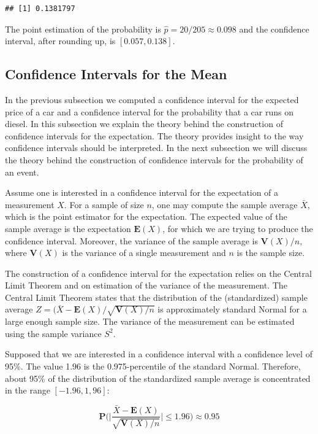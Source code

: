 \documentclass[
]{krantz}
\newcommand{\Expec}{\mathbf{E}}
\newcommand{\Prob}{\mathbf{P}}
\newcommand{\Var}{\mathbf{V}}
\theoremstyle{definition}
\theoremstyle{definition}
\theoremstyle{definition}
\theoremstyle{remark}
\begin{document}
\begin{verbatim}
## [1] 0.1381797
\end{verbatim}

The point estimation of the probability is
\(\hat p = 20/205 \approx 0.098\) and the confidence interval, after
rounding up, is \([0.057, 0.138]\).

\hypertarget{subsec:CImean}{%
\subsection{Confidence Intervals for the Mean}\label{subsec:CImean}}

In the previous subsection we computed a confidence interval for the
expected price of a car and a confidence interval for the probability
that a car runs on diesel. In this subsection we explain the theory
behind the construction of confidence intervals for the expectation. The
theory provides insight to the way confidence intervals should be
interpreted. In the next subsection we will discuss the theory behind
the construction of confidence intervals for the probability of an
event.

Assume one is interested in a confidence interval for the expectation of
a measurement \(X\). For a sample of size \(n\), one may compute the sample
average \(\bar X\), which is the point estimator for the expectation. The
expected value of the sample average is the expectation \(\Expec(X)\), for
which we are trying to produce the confidence interval. Moreover, the
variance of the sample average is \(\Var(X)/n\), where \(\Var(X)\) is the
variance of a single measurement and \(n\) is the sample size.

The construction of a confidence interval for the expectation relies on
the Central Limit Theorem and on estimation of the variance of the
measurement. The Central Limit Theorem states that the distribution of
the (standardized) sample average \(Z = (\bar X - \Expec(X)/\sqrt{\Var(X)/n}\)
is approximately standard Normal for a large enough sample size. The variance of the measurement can be estimated using the sample variance \(S^2\).

Supposed that we are interested in a confidence interval with a
confidence level of 95\%. The value 1.96 is the 0.975-percentile of the
standard Normal. Therefore, about 95\% of the distribution of the
standardized sample average is concentrated in the range \([-1.96,1,96]\):

\[\Prob \bigg(\bigg|\frac{\bar X - \Expec(X)}{\sqrt{\Var(X)/n}}\bigg| \leq 1.96 \bigg) \approx 0.95\]
\end{document}

